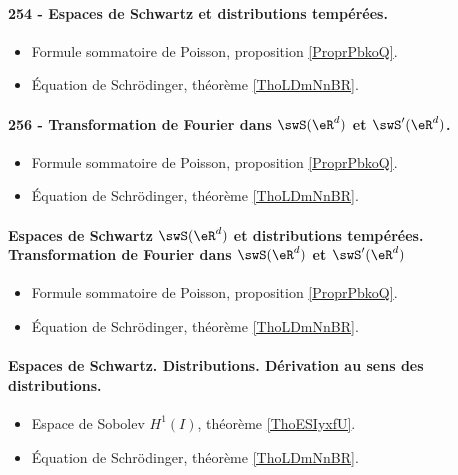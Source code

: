 \paragraph{254 - Espaces de Schwartz et distributions tempérées.}
\begin{itemize}
    \item Formule sommatoire de Poisson, proposition \ref{ProprPbkoQ}.
    \item Équation de Schrödinger, théorème \ref{ThoLDmNnBR}.
\end{itemize}
\paragraph{256 - Transformation de Fourier dans \( \swS(\eR^d)\) et \( \swS'(\eR^d)\).}
\begin{itemize}
    \item Formule sommatoire de Poisson, proposition \ref{ProprPbkoQ}.
    \item Équation de Schrödinger, théorème \ref{ThoLDmNnBR}.
\end{itemize}
\paragraph{Espaces de Schwartz \( \swS(\eR^d)\) et distributions tempérées. Transformation de Fourier dans \( \swS(\eR^d)\) et \( \swS'(\eR^d)\)}
\begin{itemize}
    \item Formule sommatoire de Poisson, proposition \ref{ProprPbkoQ}.
    \item Équation de Schrödinger, théorème \ref{ThoLDmNnBR}.
\end{itemize}
\paragraph{Espaces de Schwartz. Distributions. Dérivation au sens des distributions.}
\begin{itemize}
    \item Espace de Sobolev \( H^1(I)\), théorème \ref{ThoESIyxfU}.
    \item Équation de Schrödinger, théorème \ref{ThoLDmNnBR}.
\end{itemize}

